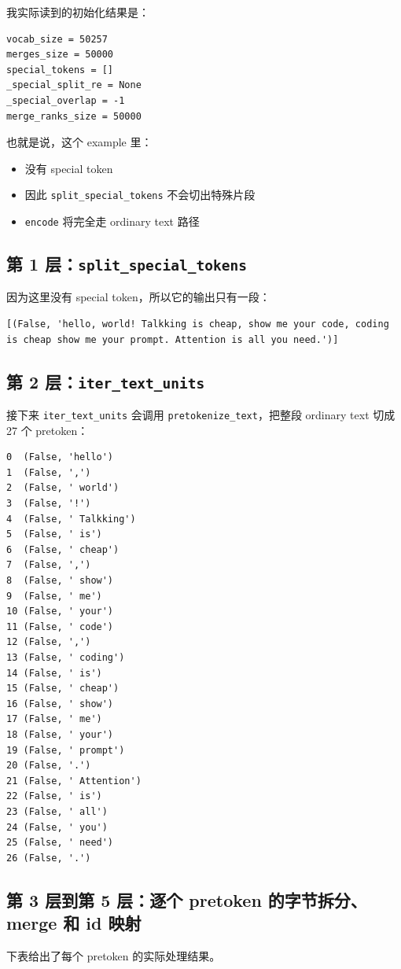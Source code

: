 \documentclass[11pt,a4paper]{ctexart}
\begin{document}
我实际读到的初始化结果是：
\begin{lstlisting}
vocab_size = 50257
merges_size = 50000
special_tokens = []
_special_split_re = None
_special_overlap = -1
merge_ranks_size = 50000
\end{lstlisting}

也就是说，这个 example 里：
\begin{itemize}[leftmargin=2em]
  \item 没有 special token
  \item 因此 \texttt{split\_special\_tokens} 不会切出特殊片段
  \item \texttt{encode} 将完全走 ordinary text 路径
\end{itemize}

\subsection{第 1 层：\texttt{split\_special\_tokens}}
因为这里没有 special token，所以它的输出只有一段：
\begin{lstlisting}
[(False, 'hello, world! Talkking is cheap, show me your code, coding is cheap show me your prompt. Attention is all you need.')]
\end{lstlisting}

\subsection{第 2 层：\texttt{iter\_text\_units}}
接下来 \texttt{iter\_text\_units} 会调用 \texttt{pretokenize\_text}，把整段 ordinary text 切成 27 个 pretoken：
\begin{lstlisting}
0  (False, 'hello')
1  (False, ',')
2  (False, ' world')
3  (False, '!')
4  (False, ' Talkking')
5  (False, ' is')
6  (False, ' cheap')
7  (False, ',')
8  (False, ' show')
9  (False, ' me')
10 (False, ' your')
11 (False, ' code')
12 (False, ',')
13 (False, ' coding')
14 (False, ' is')
15 (False, ' cheap')
16 (False, ' show')
17 (False, ' me')
18 (False, ' your')
19 (False, ' prompt')
20 (False, '.')
21 (False, ' Attention')
22 (False, ' is')
23 (False, ' all')
24 (False, ' you')
25 (False, ' need')
26 (False, '.')
\end{lstlisting}

\subsection{第 3 层到第 5 层：逐个 pretoken 的字节拆分、merge 和 id 映射}
下表给出了每个 pretoken 的实际处理结果。
\end{document}
